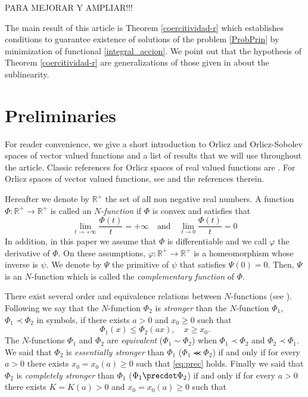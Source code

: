 \documentclass[twoside]{article}
\theoremstyle{remark}
\renewcommand{\leq}{\leqslant}
\renewcommand{\geq}{\geqslant}
\begin{document}
PARA MEJORAR Y AMPLIAR!!!

The main result of this article is Theorem \ref{coercitividad-r} which establishes conditions to guarantee existence of 
solutions of the problem \eqref{ProbPrin} by minimization of functional \eqref{integral_accion}. 
We point out that the hypothesis of
Theorem \ref{coercitividad-r} are generalizations of those given in 
\cite{wu1999periodic,zhao2004periodic,zhao2005existence,tang2010periodic} about the sublinearity.


\section{Preliminaries}\label{preliminares}

For reader convenience, we give a short introduction to Orlicz and Orlicz-Sobolev spaces of vector valued functions and a  list  of results that we will use throughout the article. 
Classic references for Orlicz spaces of real valued functions are \cite{adams_sobolev,KR,rao1991theory}.
For  Orlicz spaces of vector valued functions, see \cite{Orliczvectorial2005} and the references therein.

Hereafter we denote  by $\mathbb{R}^+$  the set of all non negative real numbers. A function $\Phi:\mathbb{R}^+\to \mathbb{R}^+ $ is called an \emph{$N$-function} if $\Phi$ is convex and satisfies that
\[
\lim_{t\to+\infty}\frac{\Phi(t)}{t}=+\infty\quad\text{and}\quad \lim_{t\to 0}\frac{\Phi(t)}{t}=0
\]
In addition,  in this paper  we assume that $\Phi$ is differentiable and we call $\varphi$  the derivative of $\Phi$. 
On these assumptions, $\varphi:\mathbb{R}^+\rightarrow \mathbb{R}^+$ is a homeomorphism whose inverse is $\psi$. 
We denote by $\Psi$ the primitive of $\psi$ that satisfies $\Psi(0)=0$. Then, $\Psi$ is an $N$-function which  is called the \emph{complementary function} of $\Phi$.


There exist several order and equivalence relations between $N$-functions (see \cite[Sec. 2.2]{rao1991theory}).
Following \cite[Def. 1, p. 15-16]{rao1991theory} we say that the   $N$-function $\Phi_2$ is \emph{stronger} than the $N$-function  $\Phi_1$,   $\Phi_1\prec\Phi_2$ in symbols, if  there exists $a>0$ and $x_0\geq 0$ such that
\begin{equation}\label{eq:prec}\Phi_1(x)\leq \Phi_2(ax), \quad x\geq x_0.\end{equation}
 The $N$-functions  $\Phi_1$ and   $\Phi_2$ are \emph{equivalent} ($\Phi_1\sim\Phi_2$)  when  $\Phi_1\prec\Phi_2$ and $\Phi_2\prec\Phi_1$.
We said that  $\Phi_2$ is \emph{essentially stronger} than  $\Phi_1$  ($\Phi_1\llcurly\Phi_2$) if and only if for every $a>0$ there exists $x_0=x_0(a)\geq 0$ such that \eqref{eq:prec} holds. Finally we said that  $\Phi_2$ is \emph{completely stronger} than  $\Phi_1$  ($\Phi_1\precdot\Phi_2$) if and only if for every $a>0$ there exists $K=K(a)>0$ and  $x_0=x_0(a)\geq 0$ such that
\end{document}
